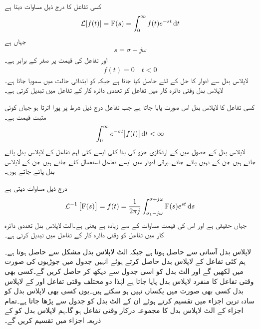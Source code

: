 
کسی تفاعل  کا  درج ذیل مساوات دیتا ہے
\begin{align}\label{مساوات_لاپلاس_بدل_تعارف}
\Laplace[f(t)]=\bF(s)=\int_0^{\infty} f(t) e^{-st}\dif t
\end{align}
جہاں   ہے
\begin{align}
s=\sigma+j\omega
\end{align}
اور تفاعل  کی قیمت  پر صفر کے برابر ہے۔
\begin{align}
f(t)=0\quad t<0
\end{align}
لاپلاس بدل سے ادوار کا حل  کے لئے حاصل کیا جاتا ہے جبکہ  کو ابتدائی حالت میں سمویا جاتا ہے۔ لاپلاس بدل وقتی دائرہ کار میں تفاعل  کو تعددی دائرہ کار کے تفاعل  میں تبدیل کرتی ہے۔ 

کسی تفاعل کا لاپلاس بدل اس صورت پایا جاتا ہے جب تفاعل درج ذیل شرط پر پورا اترتا ہو جہاں  کوئی مثبت قیمت ہے۔
\begin{align}\label{مساوات_لاپلاس_شرط_بدل_پایا_جاتا_ہے}
\int_0^{\infty} e^{-\sigma t}\abs{f(t)}\dif t<\infty
\end{align}
لاپلاس بدل کے حصول میں  کے ارتکازی جزو  کی بنا کئی ایسے کئی اہم تفاعل کے لاپلاس بدل پائے جاتے ہیں جن کے  نہیں پائے جاتے۔برقی ادوار میں ایسے تفاعل استعمال کئے جاتے ہیں جن کے لاپلاس بدل پائے جاتے ہوں۔

 درج ذیل مساوات دیتی ہے
\begin{align}
\Laplace^{-1}\left[\bF(s)\right]=f(t)=\frac{1}{2\pi j}\int_{\sigma_1-j\omega}^{\sigma+j\omega} \bF(s) e^{st} \dif s
\end{align}
 جہاں  حقیقی ہے اور اس کی قیمت مساوات  کے  سے زیادہ ہے یعنی  ہے۔الٹ لاپلاس بدل تعددی دائرہ کار میں تفاعل  کو وقتی دائرہ کار کے تفاعل  میں تبدیل کرتی ہے۔

لاپلاس بدل آسانی سے حاصل ہوتا ہے جبکہ الٹ لاپلاس بدل مشکل سے حاصل ہوتا ہے۔ہم کئی تفاعل کے لاپلاس بدل حاصل کرتے ہوئے انہیں جدول میں جوڑیوں کی صورت میں لکھیں گے اور الٹ بدل کو اسی جدول سے دیکھ کر حاصل کریں گے۔کسی بھی وقتی تفاعل  کا منفرد لاپلاس بدل  پایا جاتا ہے لہٰذا دو مختلف وقتی تفاعل  اور  کے لاپلاس بدل کسی بھی صورت میں یکساں نہیں ہو سکتے ہیں۔یوں کسی بھی لاپلاس بدل  کو سادہ ترین اجزاء میں تقسیم کرتے ہوئے ان کے الٹ بدل کو جدول سے پڑھا جاتا ہے۔تمام اجزاء کے الٹ لاپلاس بدل کا مجموعہ درکار وقتی تفاعل ہو گا۔ہم لاپلاس بدل کو  کے ذریعہ اجزاء میں تقسیم کریں گے۔

